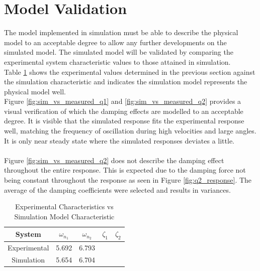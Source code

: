 \section{Model Validation}
The model implemented in simulation must be able to describe the physical model to an acceptable degree to allow any further developments on the simulated model. The simulated model will be validated by comparing the experimental system characteristic values to those attained in simulation.\\

Table \ref{table:experiment_vs_simulation} shows the experimental values determined in the previous section against the simulation characteristic and indicates the simulation model represents the physical model well.\\

Figure \ref{fig:sim_vs_measured_q1} and \ref{fig:sim_vs_measured_q2} provides a visual verification of which the damping effects are modelled to an acceptable degree. It is visible that the simulated response fits the experimental response well, matching the frequency of oscillation during high velocities and large angles. It is only near steady state where the simulated responses deviates a little. \\\\

Figure \ref{fig:sim_vs_measured_q2} does not describe the damping effect throughout the entire response. This is expected due to the damping force not being constant throughout the response as seen in Figure \ref{fig:q2_response}. The average of the damping coefficients were selected and results in variances.


\begin{table}[]
	\centering
	\begin{tabular}{|c|c|c|c|c|}
		\hline
		System & $\omega_{n_{1}}$  & $\omega_{n_{2}}$  & $\zeta_{1}$ & $\zeta_{2}$ \\
		\hline
		\hline
		Experimental  & 5.692 &  6.793 & & \\
		\hline
		Simulation & 5.654 & 6.704 & & \\ 
		\hline
	\end{tabular}
	\caption{Experimental Characteristics vs Simulation Model Characteristic}
	\label{table:experiment_vs_simulation}
\end{table}

